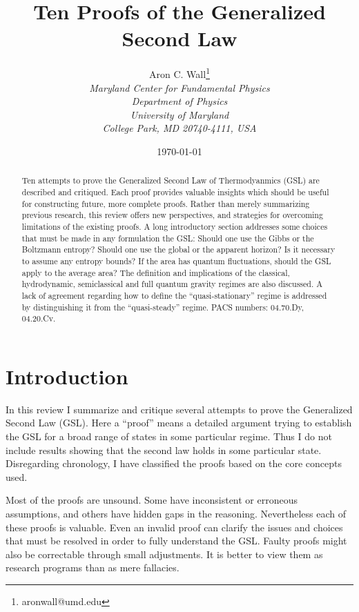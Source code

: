 \documentclass{article}
\author{Aron C. Wall\footnote{aronwall@umd.edu}
\\ \textit{Maryland Center for Fundamental Physics} \\ \textit{Department of Physics} \\ \textit{University of Maryland} \\ \textit{College Park, MD 20740-4111, USA} }
\title{Ten Proofs of the Generalized Second Law}
\date{\today}
\begin{document}
\maketitle

\begin{abstract}
Ten attempts to prove the Generalized Second Law of Thermodyanmics (GSL) are described and critiqued.  Each proof provides valuable insights which should be useful for constructing future, more complete proofs.  Rather than merely summarizing previous research, this review offers new perspectives, and strategies for overcoming limitations of the existing proofs.  A long introductory section addresses some choices that must be made in any formulation the GSL: Should one use the Gibbs or the Boltzmann entropy?  Should one use the global or the apparent horizon?  Is it necessary to assume any entropy bounds?  If the area has quantum fluctuations, should the GSL apply to the average area?  The definition and implications of the classical, hydrodynamic, semiclassical and full quantum gravity regimes are also discussed.  A lack of agreement regarding how to define the ``quasi-stationary'' regime is addressed by distinguishing it from the ``quasi-steady'' regime.
\newline\newline
PACS numbers: 04.70.Dy, 04.20.Cv.
\end{abstract}

\newpage
\tableofcontents
\newpage

\section{Introduction}\label{intro}

In this review I summarize and critique several attempts to prove the Generalized Second Law (GSL).  Here a ``proof'' means a detailed argument trying to establish the GSL for a broad range of states in some particular regime.  Thus I do not include results showing that the second law holds in some particular state.  Disregarding chronology, I have classified the proofs based on the core concepts used.

Most of the proofs are unsound.  Some have inconsistent or erroneous assumptions, and others have hidden gaps in the reasoning.  Nevertheless each of these proofs is valuable.  Even an invalid proof can clarify the issues and choices that must be resolved in order to fully understand the GSL.  Faulty proofs might also be correctable through small adjustments.  It is better to view them as research programs than as mere fallacies.
\end{document}
